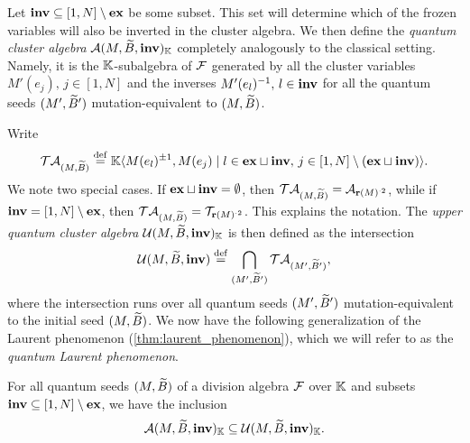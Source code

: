 Let $\mathbf{inv} \subseteq [1, N]\setminus \mathbf{ex}$ be some subset. This set will determine which
of the frozen variables will also be inverted in the cluster algebra. We then define
the \emph{quantum cluster algebra} $\mathcal{A}(M, \widetilde{B}, \mathbf{inv})_{\mathbb{K}}$ completely analogously to the classical setting.
Namely, it is the $\mathbb{K}$-subalgebra of $\mathcal{F}$ generated by all the cluster variables
$M'(e_j), \, j \in [1, N]$ and the inverses $M'(e_l)^{-1}, \, l \in \mathbf{inv}$ for all the
quantum seeds $(M', \widetilde{B}')$ mutation-equivalent to $(M, \widetilde{B})$.

Write
\begin{equation*}
	\mathcal{T}\mathcal{A}_{(M, \widetilde{B})} \overset{\mathrm{def}}{=} \mathbb{K}\langle M(e_l)^{\pm 1}, M(e_j) \mid l \in \mathbf{ex} \sqcup \mathbf{inv},\, j \in [1, N] \setminus (\mathbf{ex} \sqcup \mathbf{inv})\rangle.
\end{equation*}
%
We note two special cases. If $\mathbf{ex} \sqcup \mathbf{inv} = \emptyset$, then $\mathcal{T}\mathcal{A}_{(M, \widetilde{B})}
	= \mathcal{A}_{\mathbf{r}(M)^{\cdot 2}}$, while if $\mathbf{inv} = [1, N] \setminus \mathbf{ex}$, then
$\mathcal{T}\mathcal{A}_{(M, \widetilde{B})} = \mathcal{T}_{\mathbf{r}(M)^{\cdot 2}}$. This explains the notation. The
\emph{upper quantum cluster algebra} $\mathcal{U}(M, \widetilde{B},
	\mathbf{inv})_{\mathbb{K}}$ is then defined as the intersection
\begin{equation*}
	\mathcal{U}(M, \widetilde{B}, \mathbf{inv}) \overset{\mathrm{def}}{=} \bigcap_{(M', \widetilde{B}')} \mathcal{T}\mathcal{A}_{(M', \widetilde{B}')} ,
\end{equation*}
%
%
where the intersection runs over all quantum seeds $(M', \widetilde{B}')$ mutation-equivalent to
the initial seed $(M, \widetilde{B})$. We now have the following generalization of the Laurent
phenomenon (\cref{thm:laurent_phenomenon}), which we will refer to as the \emph{quantum
	Laurent phenomenon}.
\begin{theorem}\label{thm:quantum_laurent}

	For all quantum seeds $(M, \widetilde{B})$ of a division algebra $\mathcal{F}$ over $\mathbb{K}$ and subsets
	$\mathbf{inv} \subseteq [1, N] \setminus \mathbf{ex}$, we have the inclusion
	\begin{equation*}
		\mathcal{A}(M, \widetilde{B}, \mathbf{inv})_{\mathbb{K}} \subseteq \mathcal{U}(M, \widetilde{B}, \mathbf{inv})_{\mathbb{K}}.
	\end{equation*}
\end{theorem}

